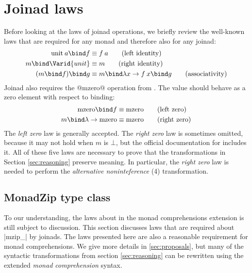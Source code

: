 \documentclass[preprint]{sigplanconf}
\begin{document}
\section{Joinad laws}
\label{sec:laws}

Before looking at the laws of joinad operations, we briefly review the well-known laws that are 
required for any monad and therefore also for any joinad:
\begin{align*}
\text{unit} \: a \bind f &\equiv f \: a \tag{left identity} \\
m \bind \Varid{unit} &\equiv m \tag{right identity} \\
(m \bind f) \bind g &\equiv m \bind \lambda x \rightarrow f \: x \bind g \tag{associativity}
\end{align*}
Joinad also requires the @mzero@ operation from . The value should behave as a 
zero element with respect to binding:
\begin{align*}
\mzero \bind f &\equiv \mzero \tag {left zero} \\
m \bind \lambda \rightarrow \mzero &\equiv \mzero \tag{right zero}
\end{align*}
The \textit{left zero} law is generally accepted. The \textit{right zero} law is sometimes omitted, 
because it may not hold when $m$ is $\bot$, but the official documentation for 
\cite{monadplusdoc} includes it. All of these five laws are necessary to prove that the 
transformations in Section \ref{sec:reasoning} preserve meaning. In particular, the \textit{right 
zero} law is needed to perform the \textit{alternative noninteference} (4) transformation.


\subsection{MonadZip type class}
\label{sec:laws-monadzip}

To our understanding, the laws about  in the monad comprehensions extension
\cite{bringbackmc} is still subject to discussion. This section discusses laws that are required
about |mzip_| by joinads. The laws presented here are also a reasonable requirement for monad 
comprehensions. We give more details in \ref{sec:proposals}, but many of the syntactic 
transformations from section \ref{sec:reasoning} can be rewritten using the extended 
\textit{monad comprehension} syntax. 
\end{document}
